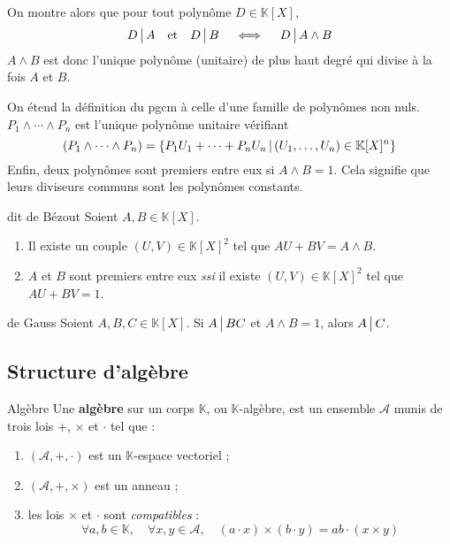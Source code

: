     On montre alors que pour tout polynôme $D \in \mathbb{K}[X]$, 
    \[ D \, \big| \, A \quad \text{et} \quad D \, \big| \, B \quad \iff \quad D \, \big| \, A \wedge B \]   
    $A \wedge B$ est donc l’unique polynôme (unitaire) de plus haut degré qui divise à la fois $A$ et $B$.

    On étend la définition du pgcm à celle d’une famille de polynômes non nuls. $P_1 \wedge \cdots \wedge P_n$ est l’unique polynôme unitaire vérifiant 
    \[ (P_1 \wedge \cdots \wedge P_n) = \left\{P_1 U_1 + \cdots + P_n U_n \, \middle| \, (U_1,\ldots,U_n) \in \mathbb{K}[X]^n\right\} \]
    Enfin, deux polynômes sont premiers entre eux si $A \wedge B = 1$. Cela signifie que leurs diviseurs communs sont les polynômes constants.

    \begin{theo}{dit de Bézout}{}
        Soient $A,B \in \mathbb{K}[X]$.
        \begin{enumerate}
            \item Il existe un couple $(U,V) \in \mathbb{K}[X]^2$ tel que $AU + BV = A \wedge B$.
            \item $A$ et $B$ sont premiers entre eux \textit{ssi} il existe $(U,V) \in \mathbb{K}[X]^2$ tel que $AU + BV = 1$.
        \end{enumerate}
    \end{theo}

    \begin{lem}{de Gauss}{}
        Soient $A,B,C \in \mathbb{K}[X]$. Si $A \, \big| \, BC$ et $A \wedge B = 1$, alors $A \, \big| \, C$.
    \end{lem}

\subsection{Structure d’algèbre}

    \begin{defi}{Algèbre}{}
        Une \textbf{algèbre} sur un corps $\mathbb{K}$, ou $\mathbb{K}$-algèbre, est un ensemble $\mathcal{A}$ munis de trois lois $+$, $\times$ et $\cdotp$ tel que :
        \begin{enumerate}[label=$(h_{\alph*})$]
            \item $(\mathcal{A}, +, \cdotp)$ est un $\mathbb{K}$-espace vectoriel ;
            \item $(\mathcal{A}, +, \times)$ est un anneau ;
            \item les lois $\times$ et $\cdotp$ sont \textit{compatibles} :
            \[ \forall a,b \in \mathbb{K}, \quad \forall x,y \in \mathcal{A}, \quad (a \cdotp x) \times (b \cdotp y) = ab \cdotp (x \times y) \]   
        \end{enumerate}
    \end{defi}


